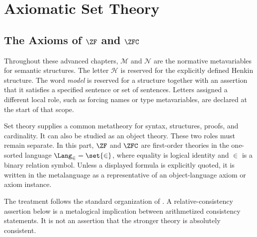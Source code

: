 \part{Axiomatic Set Theory}
\label{part:set-theory}

\chapter[The Axioms of ZF and ZFC]{The Axioms of \(\ZF\) and \(\ZFC\)}
\label{ch:zf-zfc}

\begin{convention}
Throughout these advanced chapters, \(\mathcal M\) and \(\mathcal N\) are the
normative metavariables for semantic structures.  The letter \(\mathcal H\) is
reserved for the explicitly defined Henkin structure.  The word \emph{model}
is reserved for a structure together with an assertion that it satisfies a
specified sentence or set of sentences.  Letters assigned a different local
role, such as forcing names or type metavariables, are declared at the start of
that scope.
\end{convention}

Set theory supplies a common metatheory for syntax, structures, proofs, and
cardinality.  It can also be studied as an object theory.  These two roles must
remain separate.  In this part, \(\ZF\) and \(\ZFC\) are first-order theories in
the one-sorted language \(\Lang_{\in}=\set{\in}\), where equality is logical
identity and \(\in\) is a binary relation symbol.  Unless a displayed formula
is explicitly quoted, it is written in the metalanguage as a representative of
an object-language axiom or axiom instance.

The treatment follows the standard organization of \cite{Jech2003}.  A
relative-consistency assertion below is a metalogical implication between
arithmetized consistency statements.  It is not an assertion that the stronger
theory is absolutely consistent.

